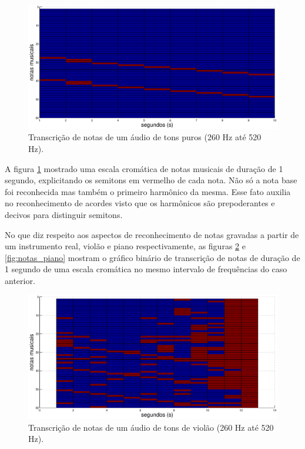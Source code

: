 \begin{figure}[h]
    \centering
    \includegraphics[keepaspectratio=true,scale=0.4]{figuras/notas_puras.eps}
  \caption{Transcrição de notas de um áudio de tons puros (260 Hz até 520 Hz).}
  \label{fig:notas_puras}
\end{figure}

\newpage
A figura \ref{fig:notas_puras} mostrado uma escala cromática de notas musicais de duração de 1 segundo, explicitando os semitons em vermelho de cada nota. Não só a nota base foi reconhecida mas também o primeiro harmônico da mesma. Esse fato auxilia no reconhecimento de acordes visto que os harmônicos são prepoderantes e decivos para distinguir semitons. 

No que diz respeito aos aspectos de reconhecimento de notas gravadas a partir de um instrumento real, violão e piano respectivamente, as figuras \ref{fig:notas_violao} e \ref{fig:notas_piano} mostram o gráfico binário de transcrição de notas de duração de 1 segundo de uma escala cromática no mesmo intervalo de frequências do caso anterior.

\begin{figure}[h]
    \centering
    \includegraphics[keepaspectratio=true,scale=0.49]{figuras/notas_violao.eps}
  \caption{Transcrição de notas de um áudio de tons de violão (260 Hz até 520 Hz).}
  \label{fig:notas_violao}
\end{figure}

